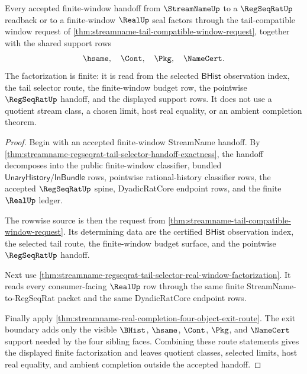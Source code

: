 \begin{theorem}
\label{thm:streamname-tail-compatible-window-coverage}
Every accepted finite-window handoff from $\StreamNameUp$ to a $\RegSeqRatUp$
readback or to a finite-window $\RealUp$ seal factors through the
tail-compatible window request of
\autoref{thm:streamname-tail-compatible-window-request}, together with the
shared support rows
$$
\hsame,\quad \Cont,\quad \Pkg,\quad \NameCert.
$$
The factorization is finite: it is read from the selected $\mathsf{BHist}$
observation index, the tail selector route, the finite-window budget row, the
pointwise $\RegSeqRatUp$ handoff, and the displayed support rows. It does not
use a quotient stream class, a chosen limit, host real equality, or an ambient
completion theorem.
\end{theorem}
\begin{proof}
Begin with an accepted finite-window StreamName handoff. By
\autoref{thm:streamname-regseqrat-tail-selector-handoff-exactness}, the
handoff decomposes into the public finite-window classifier, bundled
$\mathsf{UnaryHistory}/\mathsf{InBundle}$ rows, pointwise rational-history
classifier rows, the accepted $\RegSeqRatUp$ spine, DyadicRatCore endpoint
rows, and the finite $\RealUp$ ledger.

The rowwise source is then the request from
\autoref{thm:streamname-tail-compatible-window-request}. Its determining data
are the certified $\mathsf{BHist}$ observation index, the selected tail route,
the finite-window budget surface, and the pointwise $\RegSeqRatUp$ handoff.

Next use
\autoref{thm:streamname-regseqrat-tail-selector-real-window-factorization}.
It reads every consumer-facing $\RealUp$ row through the same finite
StreamName-to-RegSeqRat packet and the same DyadicRatCore endpoint rows.

Finally apply
\autoref{thm:streamname-real-completion-four-object-exit-route}. The exit
boundary adds only the visible $\BHist$, $\hsame$, $\Cont$, $\Pkg$, and
$\NameCert$ support needed by the four sibling faces. Combining these route
statements gives the displayed finite factorization and leaves quotient
classes, selected limits, host real equality, and ambient completion outside
the accepted handoff.
\end{proof}


